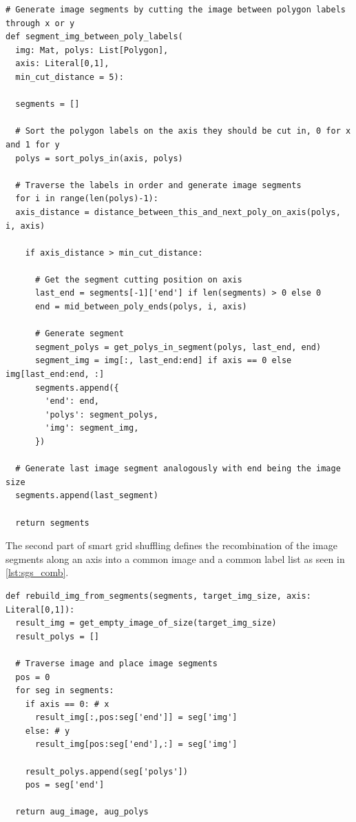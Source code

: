 \documentclass[10pt]{book}
\newenvironment{code}{\captionsetup{type=listing}}{}
\begin{document}
\begin{code}
\label{lst:sgs_cut}
\begin{verbatim}
# Generate image segments by cutting the image between polygon labels through x or y
def segment_img_between_poly_labels(
  img: Mat, polys: List[Polygon], 
  axis: Literal[0,1], 
  min_cut_distance = 5):

  segments = []
  
  # Sort the polygon labels on the axis they should be cut in, 0 for x and 1 for y
  polys = sort_polys_in(axis, polys)
  
  # Traverse the labels in order and generate image segments
  for i in range(len(polys)-1):
  axis_distance = distance_between_this_and_next_poly_on_axis(polys, i, axis)

    if axis_distance > min_cut_distance:

      # Get the segment cutting position on axis
      last_end = segments[-1]['end'] if len(segments) > 0 else 0
      end = mid_between_poly_ends(polys, i, axis)

      # Generate segment
      segment_polys = get_polys_in_segment(polys, last_end, end)
      segment_img = img[:, last_end:end] if axis == 0 else img[last_end:end, :]
      segments.append({
        'end': end,
        'polys': segment_polys,
        'img': segment_img,
      })

  # Generate last image segment analogously with end being the image size
  segments.append(last_segment)
  
  return segments
\end{verbatim}
\end{code}

The second part of smart grid shuffling defines the recombination of the image segments along an axis into a common image and a common label list as seen in \autoref{lst:sgs_comb}.

\begin{code}
\label{lst:sgs_comb}
\begin{verbatim}
def rebuild_img_from_segments(segments, target_img_size, axis: Literal[0,1]):
  result_img = get_empty_image_of_size(target_img_size)
  result_polys = []

  # Traverse image and place image segments
  pos = 0
  for seg in segments:
    if axis == 0: # x
      result_img[:,pos:seg['end']] = seg['img']
    else: # y
      result_img[pos:seg['end'],:] = seg['img']
        
    result_polys.append(seg['polys'])
    pos = seg['end']
    
  return aug_image, aug_polys
\end{verbatim}
\end{code}
\end{document}

